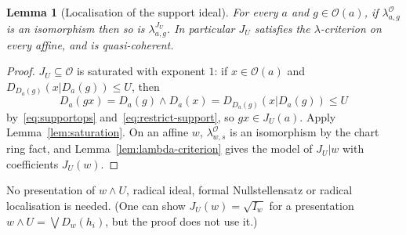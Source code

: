 \documentclass[11pt]{amsart}
\newtheorem{lemma}[theorem]{Lemma}
\theoremstyle{definition}\newtheorem{definition}[theorem]{Definition}
\theoremstyle{remark}\newtheorem{remark}[theorem]{Remark}
\newcommand{\OO}{\mathcal O}
\begin{document}
\begin{lemma}[Localisation of the support ideal]\label{lem:J-qc}
For every $a$ and $g\in\OO(a)$, if $\lambda^{\OO}_{a,g}$ is an
isomorphism then so is $\lambda^{J_U}_{a,g}$. In particular $J_U$
satisfies the $\lambda$-criterion on every affine, and is quasi-coherent.
\end{lemma}
\begin{proof}
$J_U\subseteq\OO$ is saturated with exponent $1$: if
$x\in\OO(a)$ and $D_{D_a(g)}(x|D_a(g))\le U$, then
\[
 D_a(gx)=D_a(g)\wedge D_a(x)=D_{D_a(g)}(x|D_a(g))\le U
\]
by~\eqref{eq:supportops} and~\eqref{eq:restrict-support}, so
$gx\in J_U(a)$. Apply Lemma~\ref{lem:saturation}. On an affine $w$,
$\lambda^{\OO}_{w,s}$ is an isomorphism by the chart ring fact, and
Lemma~\ref{lem:lambda-criterion} gives the model of $J_U|w$ with
coefficients $J_U(w)$.
\end{proof}

No presentation of $w\wedge U$, radical ideal, formal Nullstellensatz
or radical localisation is needed. (One can show $J_U(w)=\sqrt{I_w}$
for a presentation $w\wedge U=\bigvee D_w(h_i)$, but the proof does not
use it.)
\end{document}
